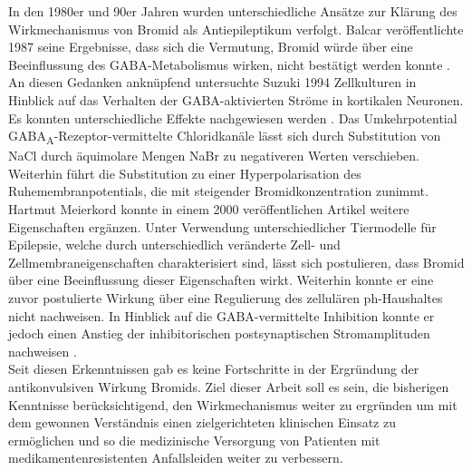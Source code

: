 \documentclass[a4paper,11pt]{report}
\begin{document}
{In den 1980er und 90er Jahren wurden unterschiedliche Ansätze zur Klärung des Wirkmechanismus von Bromid als Antiepileptikum verfolgt. Balcar veröffentlichte 1987 seine Ergebnisse, dass sich die Vermutung, Bromid würde über eine Beeinflussung des GABA-Metabolismus wirken, nicht bestätigt werden konnte \cite{Balcar.1987}. An diesen Gedanken anknüpfend untersuchte Suzuki 1994 Zellkulturen in Hinblick auf das Verhalten der GABA-aktivierten Ströme in kortikalen Neuronen. Es konnten unterschiedliche Effekte nachgewiesen werden \cite{Suzuki.1994}. Das Umkehrpotential GABA\textsubscript{A}-Rezeptor-vermittelte Chloridkanäle \cite{Allen.1977} lässt sich durch Substitution von NaCl durch äquimolare Mengen NaBr zu negativeren Werten verschieben. Weiterhin führt die Substitution zu einer Hyperpolarisation des Ruhemembranpotentials, die mit steigender Bromidkonzentration zunimmt. Hartmut Meierkord konnte in einem 2000 veröffentlichen Artikel weitere Eigenschaften ergänzen. Unter Verwendung unterschiedlicher Tiermodelle für Epilepsie, welche durch unterschiedlich veränderte Zell- und Zellmembraneigenschaften charakterisiert sind, lässt sich postulieren, dass Bromid über eine Beeinflussung dieser Eigenschaften wirkt. Weiterhin konnte er eine zuvor postulierte Wirkung über eine Regulierung des zellulären ph-Haushaltes nicht nachweisen. In Hinblick auf die GABA-vermittelte Inhibition konnte er jedoch einen Anstieg der inhibitorischen postsynaptischen Stromamplituden nachweisen \cite{Meierkord.2000}.\\
Seit diesen Erkenntnissen gab es keine Fortschritte in der Ergründung der antikonvulsiven Wirkung Bromids. Ziel dieser Arbeit soll es sein, die bisherigen Kenntnisse berücksichtigend, den Wirkmechanismus weiter zu ergründen um mit dem gewonnen Verständnis einen zielgerichteten klinischen Einsatz zu ermöglichen und so die medizinische Versorgung von Patienten mit medikamentenresistenten Anfallsleiden weiter zu verbessern.

}
\end{document}
